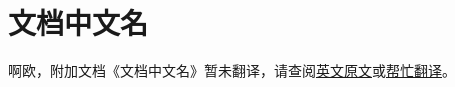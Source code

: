 \renewcommand{\DOCNAME}{文档中文名}
\renewcommand{\DOCSLUG}{文档网址的最后一部分}

\chapter{
    \DOCNAME
}

\label{chap:DOC-\DOCSLUG}

啊欧，附加文档《\DOCNAME 》暂未翻译，请查阅\href{http://scp-wiki.wikidot.com/\DOCSLUG}{英文原文}或\href{http://scp-wiki-cn.wikidot.com/\DOCSLUG}{帮忙翻译}。
